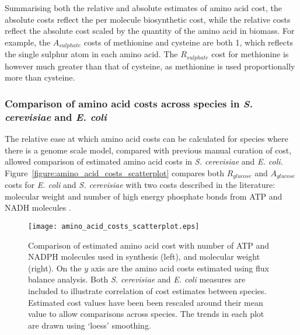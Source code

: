 Summarising both the relative and absolute estimates of amino acid cost, the absolute costs reflect the per molecule biosynthetic cost, while the relative costs reflect the absolute cost scaled by the quantity of the amino acid in biomass. For example, the $A_{sulphate}$ costs of methionine and cysteine are both 1, which reflects the single sulphur atom in each amino acid. The $R_{sulphate}$ cost for methionine is however much greater than that of cysteine, as methionine is used proportionally more than cysteine.

\subsubsection{Comparison of amino acid costs across species in \emph{S. cerevisiae} and \emph{E. coli}}%

The relative ease at which amino acid costs can be calculated for species where there is a genome scale model, compared with previous manual curation of cost, allowed comparison of estimated amino acid costs in \emph{S. cerevisiae} and \emph{E. coli}. Figure~\vref{figure:amino_acid_costs_scatterplot} compares both $R_{glucose}$ and $A_{glucose}$ costs for \emph{E. coli} and \emph{S. cerevisiae} with two costs described in the literature: molecular weight \cite{seligmann2003} and number of high energy phosphate bonds from ATP and NADH molecules \cite{akashi2002}.

\begin{figure}%
\centering
\texttt{[image: amino\_acid\_costs\_scatterplot.eps]}
\caption[Comparison of the genome scale model derived cost data sets.]{Comparison of estimated amino acid cost with number of ATP and NADPH molecules used in synthesis \cite{akashi2002} (left), and molecular weight \cite{seligmann2003} (right). On the $y$ axis are the amino acid costs estimated using flux balance analysis. Both \emph{S. cerevisiae} and \emph{E. coli} measures are included to illustrate correlation of cost estimates between species. Estimated cost values have been been rescaled around their mean value to allow comparisons across species. The trends in each plot are drawn using `loess' smoothing.}
\label{figure:amino_acid_costs_scatterplot}
\end{figure}%

